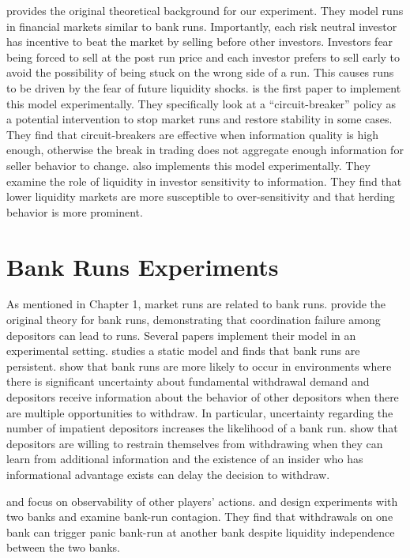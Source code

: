\documentclass[thesis]{uathesis}
\begin{document}
\begin{body}
\cite{bernardo2004liquidity} provides the original theoretical background for our experiment. They model runs in financial markets similar to bank runs. Importantly, each risk neutral investor has incentive to beat the market by selling before other investors. Investors fear being forced to sell at the post run price and each investor prefers to sell early to avoid the possibility of being stuck on the wrong side of a run. This causes runs to be driven by the fear of future liquidity shocks. \cite{magnani2020dynamic} is the first paper to implement this model experimentally. They specifically look at a ``circuit-breaker'' policy as a potential intervention to stop market runs and restore stability in some cases. They find that circuit-breakers are effective when information quality is high enough, otherwise the break in trading does not aggregate enough information for seller behavior to change. \cite{choi2022market} also implements this model experimentally. They examine the role of liquidity in investor sensitivity to information. They find that lower liquidity markets are more susceptible to over-sensitivity and that herding behavior is more prominent.


\section{Bank Runs Experiments}

As mentioned in Chapter 1, market runs are related to bank runs. \cite{diamond1983bank} provide the original theory for bank runs, demonstrating that coordination failure among depositors can lead to runs. Several papers implement their model in an experimental setting. \cite{madies2006experimental} studies a static model and finds that bank runs are persistent. \cite{garratt2009bank} show that bank runs are more likely to occur in environments where there is significant uncertainty about fundamental withdrawal demand and depositors receive information about the behavior of other depositors when there are multiple opportunities to withdraw. In particular,  uncertainty regarding the number of impatient depositors increases the likelihood of a bank run.  \cite{schotter2009dynamics} show that depositors are willing to restrain themselves from withdrawing when they can learn from additional information and the existence of an insider who has informational advantage exists can delay the decision to withdraw.



\cite{kiss2014social} and \cite{kiss2018panic} focus on observability of other players' actions. \cite{chakravarty2014experiment} and \cite{brown2017understanding} design experiments with two banks and examine bank-run contagion. They find that withdrawals on one bank can trigger panic bank-run at another bank despite liquidity independence between the two banks.


\end{body}
\end{document}
